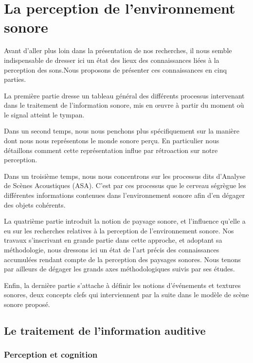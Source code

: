 \chapter{La perception de l'environnement sonore}\label{ch:psycho_ea}

Avant d'aller plus loin dans la présentation de nos recherches, il nous semble indispensable de dresser ici un état des lieux des connaissances liées à la perception des sons.Nous proposons de présenter ces connaissances en cinq parties. 

La première partie dresse un tableau général des différents processus intervenant dans le traitement de l'information sonore, mis en œuvre à partir du moment où le signal atteint le tympan. 

Dans un second temps, nous nous penchons plus spécifiquement sur la manière dont nous nous représentons le monde sonore perçu. En particulier nous détaillons comment cette représentation influe par rétroaction sur notre perception. 

Dans un troisième temps, nous nous concentrons sur les processus dits d'Analyse de Scènes Acoustiques (ASA). C'est par ces processus que le cerveau ségrègue les différentes informations contenues dans l'environnement sonore afin d'en dégager des objets cohérents. 

La quatrième partie introduit la notion de paysage sonore, et l'influence qu'elle a eu sur les recherches relatives à la perception de l'environnement sonore. Nos travaux s'inscrivant en grande partie dans cette approche, et adoptant sa méthodologie, nous dressons ici un état de l'art précis des connaissances accumulées rendant compte de la perception des paysages sonores. Nous tenons par ailleurs de dégager les grands axes méthodologiques suivis par ses études.

Enfin, la dernière partie s'attache à définir les notions d'événements et textures sonores, deux concepts clefs qui interviennent par la suite dans le modèle de scène sonore proposé.

\section{Le traitement de l'information auditive}

\subsection{Perception et cognition}

